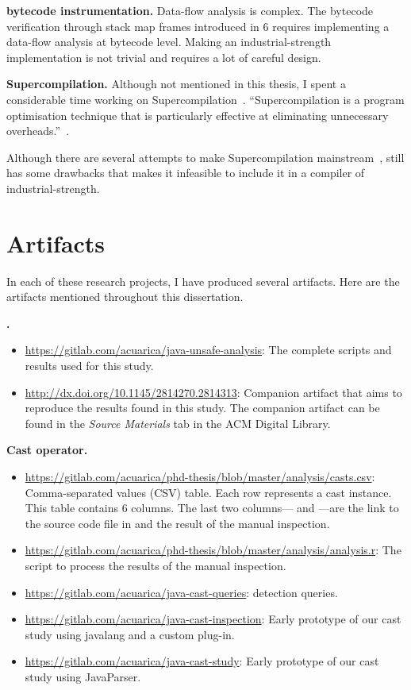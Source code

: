 \textbf{\java{} bytecode instrumentation.}
Data-flow analysis is complex.
The bytecode verification through stack map frames introduced in \java{} 6 requires implementing a data-flow analysis at bytecode level.
Making an industrial-strength implementation is not trivial
and requires a lot of careful design.

\textbf{Supercompilation.}
Although not mentioned in this thesis,
I spent a considerable time working on Supercompilation~\citep{turchinConceptSupercompiler1986}.
``Supercompilation is a program optimisation technique that is particularly effective at eliminating unnecessary overheads.''~\citep{mitchellRethinkingSupercompilation2010}.

Although there are several attempts to make Supercompilation mainstream~\citep{mitchellSupercompilerCoreHaskell2007,bolingbrokeSupercompilationEvaluation2010},
still has some drawbacks that makes it infeasible to include it in a compiler of industrial-strength.


\section{Artifacts}
\newcommand{\urlartifact}[2]{\item{\footnotesize\url{#1}}: #2}

In each of these research projects,
I have produced several artifacts.
Here are the artifacts mentioned throughout this dissertation.

\textbf{\unsafe{} \api{}.}
\begin{itemize}
\urlartifact{https://gitlab.com/acuarica/java-unsafe-analysis}{The complete scripts and results used for this study.}
\urlartifact{http://dx.doi.org/10.1145/2814270.2814313}{Companion artifact that aims to reproduce the results found in this study.
The companion artifact can be found in the \emph{Source Materials} tab in the ACM Digital Library.}
\end{itemize}

\textbf{Cast operator.}
\begin{itemize}
\urlartifact{https://gitlab.com/acuarica/phd-thesis/blob/master/analysis/casts.csv}{Comma-separated values (CSV) table.
Each row represents a cast instance.
This table contains 6 columns.
The last two columns---\col{link} and \col{value}---are the link to the source code file in \lgtm{} and the result of the manual inspection.}
\urlartifact{https://gitlab.com/acuarica/phd-thesis/blob/master/analysis/analysis.r}{The script to process the results of the manual inspection.}
\urlartifact{https://gitlab.com/acuarica/java-cast-queries}{\ql{} detection queries.}
\urlartifact{https://gitlab.com/acuarica/java-cast-inspection}{Early prototype of our cast study using javalang and a custom \javac{} plug-in.}
\urlartifact{https://gitlab.com/acuarica/java-cast-study}{Early prototype of our cast study using JavaParser.}
\end{itemize}

